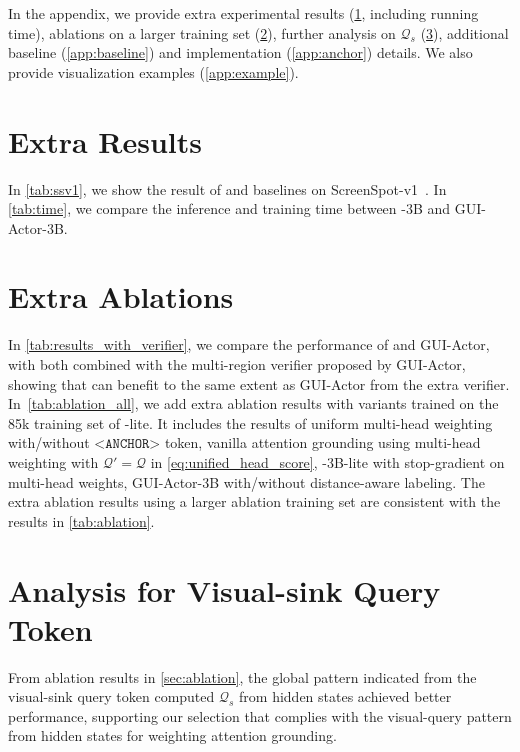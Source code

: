 \newpage
\appendix
{}
In the appendix, we provide extra experimental results (\cref{app:extra_res}, including running time), ablations on a larger training set (\cref{app:extra_abla}), further analysis on $\mathcal{Q}_s$ (\cref{app:qs_analysis}), additional baseline (\cref{app:baseline}) and implementation (\cref{app:anchor}) details. We also provide visualization examples (\cref{app:example}).
\section{Extra Results} \label{app:extra_res}
In \cref{tab:ssv1},  we show the result of \method{} and baselines on ScreenSpot-v1~\citep{cheng2024seeclick}. In \cref{tab:time},  we compare the inference and training time between \method{}-3B and GUI-Actor-3B.

\section{Extra Ablations} \label{app:extra_abla}
In \cref{tab:results_with_verifier}, we compare the performance of \method{} and GUI-Actor, with both combined with the multi-region verifier proposed by GUI-Actor, showing that \method{} can benefit to the same extent as GUI-Actor from the extra verifier.  In~\cref{tab:ablation_all}, we add extra ablation results with variants trained on the 85k training set of \method{}-lite. It includes the results of uniform multi-head weighting with/without $\texttt{<ANCHOR>}$ token, vanilla attention grounding using multi-head weighting with $\mathcal{Q}'=\mathcal{Q}$ in \cref{eq:unified_head_score}, \method{}-3B-lite with stop-gradient on multi-head weights, GUI-Actor-3B with/without distance-aware labeling. The extra ablation results using a larger ablation training set are consistent with the results in \cref{tab:ablation}.

% 
\section{Analysis for Visual-sink Query Token} \label{app:qs_analysis}
From ablation results in \cref{sec:ablation}, the global pattern indicated from the visual-sink query token computed $\mathcal{Q}_s$ from hidden states achieved better performance, supporting our selection that complies with the visual-query pattern from hidden states for weighting attention grounding.

